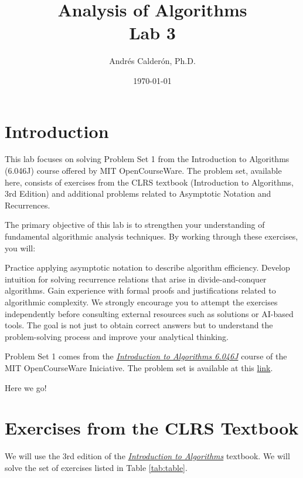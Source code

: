 \documentclass[11pt]{article}
\title{Analysis of Algorithms \\ Lab 3}
\author{Andrés Calderón, Ph.D.}
\date{\today}
\begin{document}
\maketitle

\section{Introduction}
This lab focuses on solving Problem Set 1 from the Introduction to Algorithms (6.046J) course offered by MIT OpenCourseWare. The problem set, available here, consists of exercises from the CLRS textbook (Introduction to Algorithms, 3rd Edition) and additional problems related to Asymptotic Notation and Recurrences.

The primary objective of this lab is to strengthen your understanding of fundamental algorithmic analysis techniques. By working through these exercises, you will:

Practice applying asymptotic notation to describe algorithm efficiency.
Develop intuition for solving recurrence relations that arise in divide-and-conquer algorithms.
Gain experience with formal proofs and justifications related to algorithmic complexity.
We strongly encourage you to attempt the exercises independently before consulting external resources such as solutions or AI-based tools. The goal is not just to obtain correct answers but to understand the problem-solving process and improve your analytical thinking.

Problem Set 1 comes from the \href{https://ocw.mit.edu/courses/6-046j-introduction-to-algorithms-sma-5503-fall-2005/}{\textit{Introduction to Algorithms 6.046J}} course of the MIT OpenCourseWare Iniciative.  The problem set is available at this \href{https://ocw.mit.edu/courses/6-046j-introduction-to-algorithms-sma-5503-fall-2005/21bf373b58dcd53a7650a8072a76a448_ps1.pdf}{link}.

Here we go!

\section{Exercises from the CLRS Textbook}\label{sec:exercises}
We will use the 3rd edition of the \href{https://mitpress.mit.edu/9780262533058/introduction-to-algorithms/}{\textit{Introduction to Algorithms}} textbook. We will solve the set of exercises listed in Table \ref{tab:table}.
\end{document}
